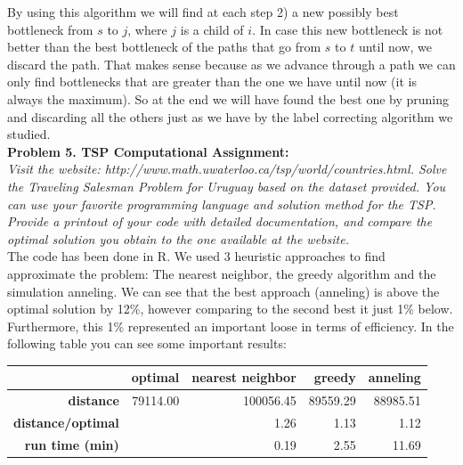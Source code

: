 \documentclass[11pt, english]{article}
\begin{document}
By using this algorithm we will find at each step 2) a new possibly best bottleneck from $s$ to $j$, where $j$ is a child of $i$. In case this new bottleneck is not better than the best bottleneck of the paths that go from $s$ to $t$ until now, we discard the path. That makes sense because as we advance through a path we can only find bottlenecks that are greater than the one we have until now (it is always the maximum). So at the end we will have found the best one by pruning and discarding all the others just as we have by the label correcting algorithm we studied.\\



\textbf{Problem 5. TSP Computational Assignment:}\\\textit{ Visit the website: http://www.math.uwaterloo.ca/tsp/world/countries.html.
Solve the Traveling Salesman Problem for Uruguay based on the dataset provided. You can use your favorite programming language and solution method for the TSP. Provide a printout of your code with detailed documentation, and compare the optimal solution you obtain to the one available at the website.}\\

The code has been done in R. We used 3 heuristic approaches to find approximate the problem: The nearest neighbor, the greedy algorithm and the simulation anneling. We can see that the best approach (anneling) is above the optimal solution by 12\%, however comparing to the second best it just 1\% below. Furthermore, this 1\% represented an important loose in terms of efficiency. In the following table you can see some important results:

\begin{table}[ht]
	\centering
	\begin{tabular}{rrrrr}
		\hline
		& \textbf{optimal} & \textbf{nearest neighbor} & \textbf{greedy} & \textbf{anneling} \\ 
		\hline
		\textbf{distance} & 79114.00 & 100056.45 & 89559.29 & 88985.51 \\ 
		\textbf{distance/optimal} &  & 1.26 & 1.13 & 1.12 \\ 
		\textbf{run time (min)} &  & 0.19 & 2.55 & 11.69 \\ 
		\hline
	\end{tabular}
\end{table}

\lstset{style=myCustomMatlabStyle2}


\end{document}
